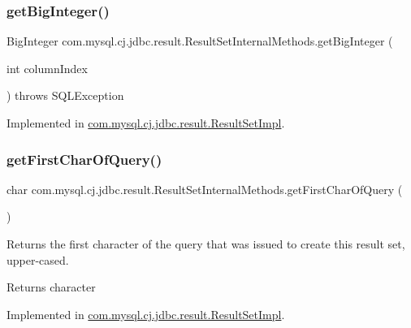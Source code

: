 \subsubsection{\texorpdfstring{get\+Big\+Integer()}{getBigInteger()}}
{\footnotesize\ttfamily Big\+Integer com.\+mysql.\+cj.\+jdbc.\+result.\+Result\+Set\+Internal\+Methods.\+get\+Big\+Integer (\begin{DoxyParamCaption}\item[{int}]{column\+Index }\end{DoxyParamCaption}) throws S\+Q\+L\+Exception}



Implemented in \mbox{\hyperlink{classcom_1_1mysql_1_1cj_1_1jdbc_1_1result_1_1_result_set_impl_a6b0d6c2f2813b5e60fb67a9e4fd05104}{com.\+mysql.\+cj.\+jdbc.\+result.\+Result\+Set\+Impl}}.

\mbox{\label{interfacecom_1_1mysql_1_1cj_1_1jdbc_1_1result_1_1_result_set_internal_methods_ab58d42f08a9145dcff574389fcb697ff}} 
\subsubsection{\texorpdfstring{get\+First\+Char\+Of\+Query()}{getFirstCharOfQuery()}}
{\footnotesize\ttfamily char com.\+mysql.\+cj.\+jdbc.\+result.\+Result\+Set\+Internal\+Methods.\+get\+First\+Char\+Of\+Query (\begin{DoxyParamCaption}{ }\end{DoxyParamCaption})}

Returns the first character of the query that was issued to create this result set, upper-\/cased.

\begin{DoxyReturn}{Returns}
character 
\end{DoxyReturn}


Implemented in \mbox{\hyperlink{classcom_1_1mysql_1_1cj_1_1jdbc_1_1result_1_1_result_set_impl_aa660f8429c96f057e5c3046f32a06a18}{com.\+mysql.\+cj.\+jdbc.\+result.\+Result\+Set\+Impl}}.

